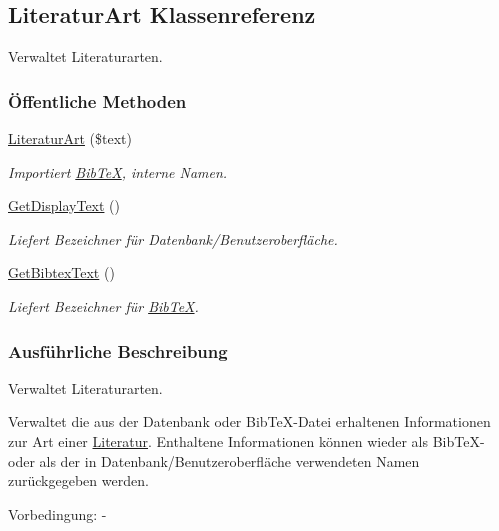 \hypertarget{classLiteraturArt}{
\subsection{Literatur\-Art Klassenreferenz}
\label{classLiteraturArt}
}
Verwaltet Literaturarten.  


\subsubsection*{\"{O}ffentliche Methoden}
\begin{CompactItemize}
\item 
\hyperlink{classLiteraturArt_b3312217430531ed7821a46a39c49af7}{Literatur\-Art} (\$text)
\begin{CompactList}\small\item\em Importiert \hyperlink{classBibTeX}{Bib\-Te\-X}, interne Namen. \item\end{CompactList}\item 
\hyperlink{classLiteraturArt_43f747a6c5d840a22ddcd7e46d27cba0}{Get\-Display\-Text} ()
\begin{CompactList}\small\item\em Liefert Bezeichner für Datenbank/Benutzeroberfläche. \item\end{CompactList}\item 
\hyperlink{classLiteraturArt_01e1a2acd95df1ae0bb22e57b70a63de}{Get\-Bibtex\-Text} ()
\begin{CompactList}\small\item\em Liefert Bezeichner für \hyperlink{classBibTeX}{Bib\-Te\-X}. \item\end{CompactList}\end{CompactItemize}


\subsubsection{Ausf\"{u}hrliche Beschreibung}
Verwaltet Literaturarten. 

Verwaltet die aus der Datenbank oder Bib\-Te\-X-Datei erhaltenen Informationen zur Art einer \hyperlink{classLiteratur}{Literatur}. Enthaltene Informationen können wieder als Bib\-Te\-X- oder als der in Datenbank/Benutzeroberfläche verwendeten Namen zurückgegeben werden. \begin{Desc}
\item[Vorbedingung:]- \end{Desc}




